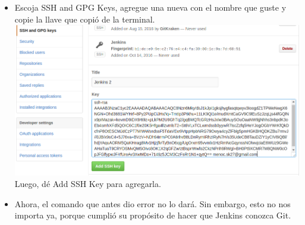 \documentclass[a4paper]{article}
\begin{document}
{\begin{itemize}
    \item Escoja SSH and GPG Keys, agregue una nueva con el nombre que guste y copie la llave que copió de la terminal.\\
    \includegraphics[scale=0.4]{sshkeygit}\\
    Luego, dé Add SSH Key para agregarla. 
    \item Ahora, el comando que antes dio error no lo dará. Sin embargo, esto no nos importa ya, porque cumplió su propósito de hacer que Jenkins conozca Git. 
    \end{itemize}
    
}
\end{document}

